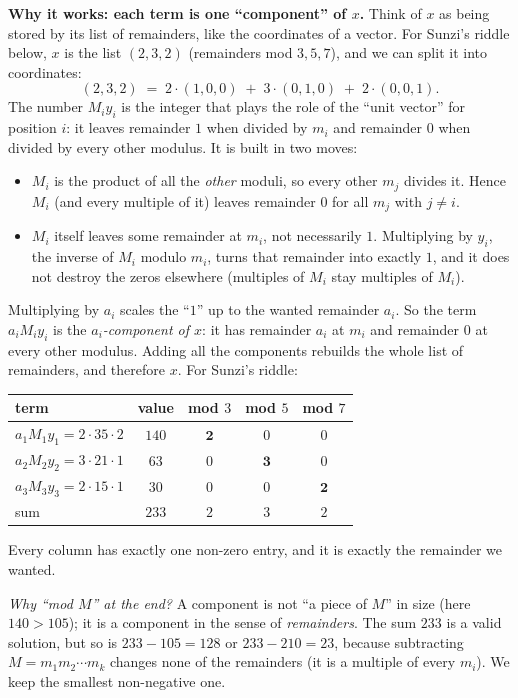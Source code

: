 \documentclass[11pt]{article}
\theoremstyle{definition}
\theoremstyle{remark}
\begin{document}
\textbf{Why it works: each term is one ``component'' of $x$.}
Think of $x$ as being stored by its list of remainders, like the coordinates of a vector. For Sunzi's riddle below, $x$ is the list $(2,3,2)$ (remainders mod $3,5,7$), and we can split it into coordinates:
\[
(2,3,2)\;=\;2\cdot(1,0,0)\;+\;3\cdot(0,1,0)\;+\;2\cdot(0,0,1).
\]
The number $M_iy_i$ is the integer that plays the role of the ``unit vector'' for position $i$: it leaves remainder $1$ when divided by $m_i$ and remainder $0$ when divided by every other modulus. It is built in two moves:
\begin{itemize}[leftmargin=1.4em,itemsep=2pt]
\item $M_i$ is the product of all the \emph{other} moduli, so every other $m_j$ divides it. Hence $M_i$ (and every multiple of it) leaves remainder $0$ for all $m_j$ with $j\ne i$.
\item $M_i$ itself leaves some remainder at $m_i$, not necessarily $1$. Multiplying by $y_i$, the inverse of $M_i$ modulo $m_i$, turns that remainder into exactly $1$, and it does not destroy the zeros elsewhere (multiples of $M_i$ stay multiples of $M_i$).
\end{itemize}
Multiplying by $a_i$ scales the ``$1$'' up to the wanted remainder $a_i$. So the term $a_iM_iy_i$ is the \emph{$a_i$-component of $x$}: it has remainder $a_i$ at $m_i$ and remainder $0$ at every other modulus. Adding all the components rebuilds the whole list of remainders, and therefore $x$. For Sunzi's riddle:
\begin{center}
\renewcommand{\arraystretch}{1.25}
\begin{tabular}{lcccc}
\toprule
term & value & mod $3$ & mod $5$ & mod $7$ \\
\midrule
$a_1M_1y_1=2\cdot35\cdot2$ & $140$ & $\mathbf{2}$ & $0$ & $0$ \\
$a_2M_2y_2=3\cdot21\cdot1$ & $63$ & $0$ & $\mathbf{3}$ & $0$ \\
$a_3M_3y_3=2\cdot15\cdot1$ & $30$ & $0$ & $0$ & $\mathbf{2}$ \\
\midrule
sum & $233$ & $2$ & $3$ & $2$ \\
\bottomrule
\end{tabular}
\end{center}
Every column has exactly one non-zero entry, and it is exactly the remainder we wanted. 

\emph{Why ``mod $M$'' at the end?} A component is not ``a piece of $M$'' in size (here $140>105$); it is a component in the sense of \emph{remainders}. The sum $233$ is a valid solution, but so is $233-105=128$ or $233-210=23$, because subtracting $M=m_1m_2\cdots m_k$ changes none of the remainders (it is a multiple of every $m_i$). We keep the smallest non-negative one.
\end{document}

